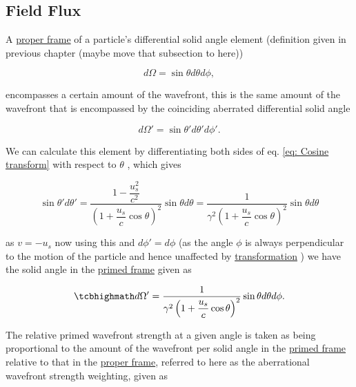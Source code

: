 \subsection{Field Flux}

A \hyperlink{def-proper-frame}{proper frame} of a particle's differential solid angle element (definition given in previous chapter (maybe move that subsection to here))

\begin{equation}
	d\Omega = \sin{\theta} d\theta d\phi,
\end{equation}

encompasses a certain amount of the wavefront, this is the same amount of the wavefront that is encompassed by the coinciding aberrated differential solid angle

\begin{equation}
	d\Omega{'} = \sin{\theta'} d\theta{'} d\phi{'}.
\end{equation}

We can calculate this element by differentiating both sides of eq.
\eqref{eq: Cosine transform} with respect to $\theta$ \cite{hogg1997special}, which gives

\begin{equation}
	\sin{\theta'} d\theta{'} = \dfrac{1-\dfrac{u_s^2}{c^2}}{\left(1+\dfrac{u_s}{c}\cos{\theta}\right)^2} \sin{\theta} d\theta = \dfrac{1}{{\gamma}^2\left(1+\dfrac{u_s}{c}\cos{\theta}\right)^2} \sin{\theta} d\theta
\end{equation}

as $v=-u_s$ now using this and $d\phi{'}=d\phi$ (as the angle $\phi$ is always perpendicular to the motion of the particle and hence unaffected by \hyperlink{def-transform}{transformation} ) we have the solid angle in the \hyperlink{def-Primed-Frame}{primed frame} given as

\begin{equation}
	\mhl{
		d\Omega{'} = \dfrac{1}{{\gamma}^2\left(1+\dfrac{u_s}{c}\cos{\theta}\right)^2} \sin{\theta} d\theta d\phi.
	}
\end{equation}

The relative primed wavefront strength at a given angle is taken as being proportional to the amount of the wavefront per solid angle in the \hyperlink{def-Primed-Frame}{primed frame} relative to that in the \hyperlink{def-proper-frame}{proper frame}, referred to here as the aberrational wavefront strength weighting, given as

